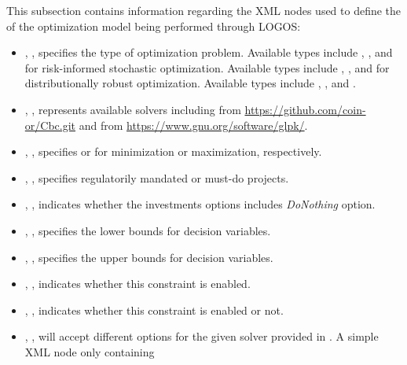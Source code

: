 This subsection contains  information regarding the XML nodes used to define the
 of the optimization model being performed through LOGOS:
\begin{itemize}
  \item {}, , specifies the type of
  optimization problem. Available types include ,
  , and  for risk-informed stochastic optimization.
  Available types include , , and 
  for distributionally robust optimization. Available types include ,
  , and .
  \item {}, , represents available solvers including
   from \url{https://github.com/coin-or/Cbc.git} and  from
  \url{https://www.gnu.org/software/glpk/}.
  \item {}, , specifies 
  or  for minimization or maximization, respectively.
  \item {}, ,
  specifies regulatorily mandated or must-do projects.
  \item {}, , indicates whether the
  investments options includes \textit{DoNothing} option.
  \item {}, , specifies the lower bounds
  for decision variables.
  \item {}, , specifies the upper bounds
  for decision variables.
  \item {}, , indicates whether
  this constraint is enabled.
  \item {}, , indicates whether
  this constraint is enabled or not.
  \item {}, , will accept
  different options for the given solver provided in . A simple XML node only containing

\end{itemize}
